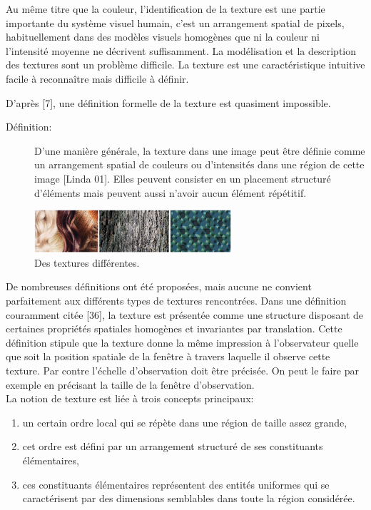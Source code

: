 Au même titre que la couleur, l'identification de la texture est une partie importante du système visuel humain, c'est un arrangement spatial de pixels, habituellement dans des modèles visuels homogènes que ni la couleur ni l'intensité moyenne ne décrivent suffisamment. La modélisation et la description des textures sont un problème difficile. La texture est une caractéristique intuitive facile à reconnaître mais difficile à définir.

D’après [7], une définition formelle de la texture est quasiment impossible.

\begin{description}
	\item[Définition:] 	
	D’une manière générale, la texture dans une image peut être définie comme un arrangement spatial de couleurs ou d'intensités dans une région de cette image [Linda 01]. Elles peuvent consister en un placement structuré d’éléments mais peuvent aussi n’avoir aucun élément répétitif.
\end{description}


\begin{figure}[H]
	\label{fig:textures}
	\centering
	\includegraphics[width=0.65\textwidth]{Figures/textures} %
	
	\caption{Des textures différentes.}
	
\end{figure}

De nombreuses définitions ont été proposées, mais aucune ne convient parfaitement aux différents types de textures rencontrées. Dans une définition couramment citée [36], la texture est présentée comme une structure disposant de certaines propriétés spatiales homogènes et invariantes par translation. Cette définition stipule que la texture donne la même impression à l'observateur quelle que soit la position spatiale de la fenêtre à travers laquelle il observe cette texture. Par contre l’échelle d’observation doit être précisée. On peut le faire par exemple en précisant la taille de la fenêtre d’observation.\\

La notion de texture est liée à trois concepts principaux:
\begin{enumerate}
	\item un certain ordre local qui se répète dans une région de taille assez grande,
	
	\item cet ordre est défini par un arrangement structuré de ses constituants élémentaires,
	
	\item ces constituants élémentaires représentent des entités uniformes qui se caractérisent par des dimensions semblables dans toute la région considérée.\\ 
	
\end{enumerate}

